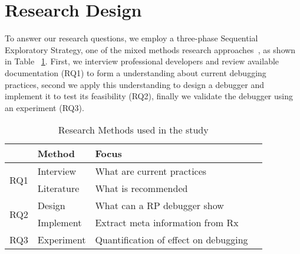\section{Research Design} %
To answer our research questions, we employ a three-phase Sequential
Exploratory Strategy, one of the mixed methods research approaches~\cite
{creswell2013research,hanson2005mixed}, as shown in Table~%
\ref{research-methods}.  First, we interview professional developers and
review available documentation (RQ1) to form a understanding about
current debugging practices, second we apply this understanding to
design a debugger and implement it to test its feasibility (RQ2),
finally we validate the debugger using an experiment (RQ3).

\begin{table}[t]
    \centering
    \begin{tabularx}{\columnwidth}
        {lllX}
        \hline
        \textbf{} & \textbf{Method} & \textbf{Focus} \\
        \hline
        \multirow{2}{*}{RQ1} & Interview & What are current practices \\
        & Literature & What is recommended \\
        \multirow{2}{*}{RQ2} & Design & What can a RP debugger show \\
        & Implement & Extract meta information from Rx \\
        RQ3 & Experiment & Quantification of effect on debugging \\
        \hline
    \end{tabularx}
    \caption{Research Methods used in the study}%
    \label{research-methods}
\end{table}
